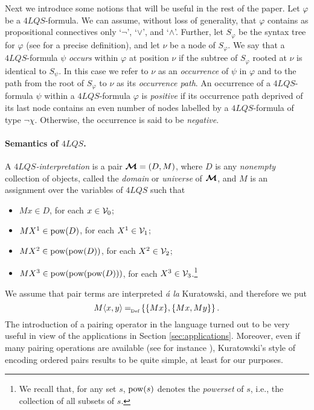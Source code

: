\documentclass{fundam}
\renewcommand{\And}{\wedge}
\newcommand{\Or}{\vee}
\newcommand{\syntree}[1]{\mathit{S}_{#1}}
\newcommand{\defAs}
   {\mbox{$\:= \! \! \raisebox{-0.5 ex}[0 ex][0 ex]{\tiny Def}\:$}}
\newcommand{\model}{\ensuremath{\mbox{\boldmath $\mathcal{M}$}}\xspace}
\newcommand{\pow}{\mbox{\rm pow}}
\newcommand{\QLQS}{\ensuremath{\mbox{$4\mathit{LQS}$}}\xspace}
\begin{document}
Next we introduce some notions that will be useful in the rest of the
paper.  Let $\varphi$ be a $\QLQS$-formula.  We can assume, without loss
of generality, that $\varphi$ contains as propositional connectives only
`$\neg$', `$\Or$', and `$\And$'.  Further, let $\syntree{\varphi}$ be the
syntax tree for $\varphi$ (see \cite{DJ90} for a precise definition), and
let $\nu$ be a node of $\syntree{\varphi}$.  We say that a
$\QLQS$-formula $\psi$ \emph{occurs} within $\varphi$ at position
$\nu$ if the subtree of $\syntree{\varphi}$ rooted at $\nu$ is identical
to $\syntree{\psi}$.  In this case we refer to $\nu$ as an
\emph{occurrence} of $\psi$ in $\varphi$ and to the path from the root
of $\syntree{\varphi}$ to $\nu$ as its \emph{occurrence path}.
An occurrence of a $\QLQS$-formula $\psi$ within a $\QLQS$-formula
$\varphi$ is \emph{positive} if its occurrence path deprived of its last
node contains an even number of nodes labelled by a $\QLQS$-formula of
type $\neg \chi$.  Otherwise, the occurrence is said to be
\emph{negative}.

\paragraph{Semantics of $\QLQS$.}
A {\em $\QLQS$-interpretation\/} is a pair $\model=(D,M)$, where $D$
is any \emph{nonempty} collection of objects, called the {\em
domain\/} or {\em universe\/} of $\model$, and $M$ is an assignment
over the variables of $\QLQS$ such that
    \begin{itemize}
        \item  $Mx \in D$, for each $x \in {\cal V}_{0}$;

        \item  $MX^{1} \in \pow(D)$, for each $X^{1} \in {\cal V}_{1}$;

        \item  $MX^{2} \in \pow(\pow(D))$, for each
        $X^{2} \in {\cal V}_{2}$;

        \item  $MX^{3} \in \pow(\pow(\pow(D)))$, for each
        $X^{3} \in {\cal V}_{3}$.\footnote{We recall that, for any set
    $s$, $\pow(s)$ denotes the \emph{powerset} of $s$, i.e., the
    collection of all subsets of $s$.}
    \end{itemize}
We assume that pair terms are interpreted \emph{\'{a} la} Kuratowski,
and therefore we put
\[
M\langle x,y\rangle \defAs \{\{Mx\},\{Mx,My\}\}\,.
\]
The introduction of a pairing operator in the language turned out to
be very useful in view of the applications in Section
\ref{sec:applications}.  Moreover, even if many pairing operations are
available (see for instance \cite{FoOmPo04}),
Kuratowski's style of encoding ordered pairs results to be quite
simple, at least for our purposes.
\end{document}
